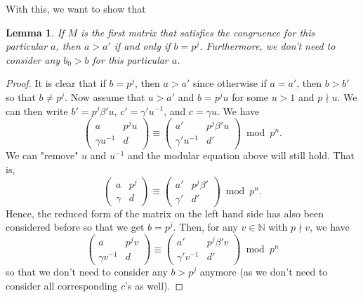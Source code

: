 \documentclass[letterpaper,12pt]{article}
\newtheorem{lemma}{Lemma}
\begin{document}
With this, we want to show that 
\begin{lemma}
If $M$ is the first matrix that satisfies the congruence for this particular $a$, then
$a > a'$ if and only if $b = p^j$.
Furthermore, we don't need to consider any $b_0 > b$ for this particular $a$.
\end{lemma}

\begin{proof}
It is clear that if $b = p^j$, then $a > a'$ since
otherwise if $a = a'$, then $b > b'$ so that $b \neq p^j$.
Now assume that $a > a'$ and $b = p^j u $ 
for some $u > 1$ and $p \nmid u$.
We can then write $b' = p^j \beta' u$, $c' = \gamma' u^{-1}$, and 
$c = \gamma u$. We have 
\[
\begin{pmatrix} a & p^j u \\ \gamma u^{-1} & d \end{pmatrix}
\equiv \begin{pmatrix} a' & p^j \beta' u \\ \gamma' u^{-1} & d' \end{pmatrix} \bmod p^n.
\]
We can "remove" $u$ and $u^{-1}$ and the modular equation above will still hold.
That is,
\[
\begin{pmatrix} a & p^j \\ \gamma & d \end{pmatrix}
\equiv \begin{pmatrix} a' & p^j \beta'\\ \gamma' & d' \end{pmatrix} \bmod p^n.
\]
Hence, the reduced form of the matrix on the left hand side has also been considered before 
so that we get $b = p^j$.
Then, for any $v \in \mathbb{N}$ with $p \nmid v$, we have 
\[
\begin{pmatrix} a & p^jv \\ \gamma v^{-1} & d \end{pmatrix}
\equiv \begin{pmatrix} a' & p^j \beta'v\\ \gamma'v^{-1} & d' \end{pmatrix} \bmod p^n
\]
so that we don't need to consider any $b > p^j$ anymore
(as we don't need to consider all corresponding $c$'s as well).
\end{proof}

\
\end{document}
